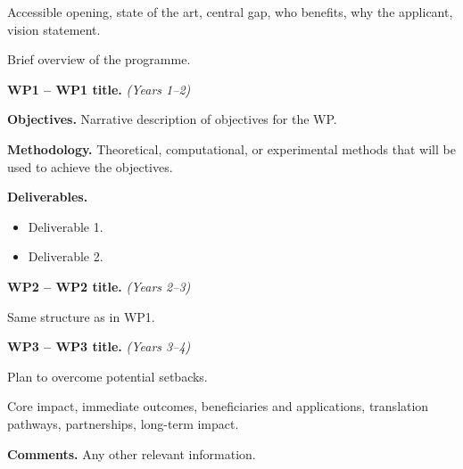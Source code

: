 \documentclass[
    11pt,
    twocolumn
]{article}
\begin{document}

Accessible opening, state of the art, central gap, who benefits, why the applicant, vision statement. \cite{}

\medskip

Brief overview of the programme.

\medskip

\textbf{WP1 -- WP1 title.} \textit{(Years 1--2)}

\textbf{Objectives.}
Narrative description of objectives for the WP.

\textbf{Methodology.}
Theoretical, computational, or experimental methods that will be used to achieve the objectives.

\textbf{Deliverables.}

\begin{itemize}[
    leftmargin=2.75ex,
    itemsep=0pt,
    topsep=0pt,
    after=\vspace{-1ex}
]
    \item Deliverable 1.

    \item Deliverable 2.
\end{itemize}

\vspace{0.75em}

\textbf{WP2 -- WP2 title.} \textit{(Years 2--3)}

Same structure as in WP1.

\vspace{0.75em}

\textbf{WP3 -- WP3 title.} \textit{(Years 3--4)}

\vspace{0.75em}

Plan to overcome potential setbacks.

\vspace{0.75em}

Core impact, immediate outcomes, beneficiaries and applications, translation pathways, partnerships, long-term impact.

\vspace{-0.25cm}

{
    
    
}

\vspace{-0.25cm}

\scriptsize
\textbf{Comments.} Any other relevant information.
\end{document}
